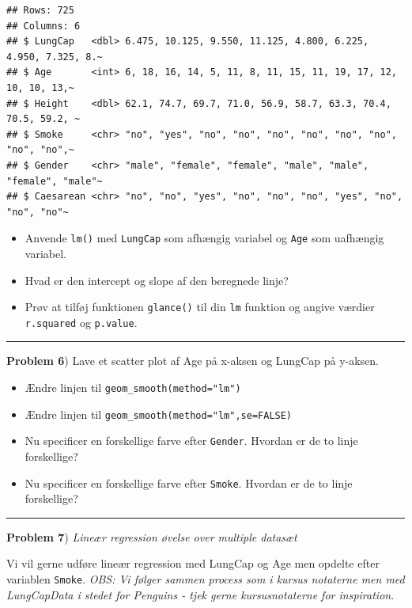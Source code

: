 \documentclass[
]{book}
\providecommand{\tightlist}{%
  \setlength{\itemsep}{0pt}\setlength{\parskip}{0pt}}
\begin{document}
\begin{verbatim}
## Rows: 725
## Columns: 6
## $ LungCap   <dbl> 6.475, 10.125, 9.550, 11.125, 4.800, 6.225, 4.950, 7.325, 8.~
## $ Age       <int> 6, 18, 16, 14, 5, 11, 8, 11, 15, 11, 19, 17, 12, 10, 10, 13,~
## $ Height    <dbl> 62.1, 74.7, 69.7, 71.0, 56.9, 58.7, 63.3, 70.4, 70.5, 59.2, ~
## $ Smoke     <chr> "no", "yes", "no", "no", "no", "no", "no", "no", "no", "no",~
## $ Gender    <chr> "male", "female", "female", "male", "male", "female", "male"~
## $ Caesarean <chr> "no", "no", "yes", "no", "no", "no", "yes", "no", "no", "no"~
\end{verbatim}

\begin{itemize}
\item
  Anvende \texttt{lm()} med \texttt{LungCap} som afhængig variabel og \texttt{Age} som uafhængig variabel.
\item
  Hvad er den intercept og slope af den beregnede linje?
\item
  Prøv at tilføj funktionen \texttt{glance()} til din \texttt{lm} funktion og angive værdier \texttt{r.squared} og \texttt{p.value}.
\end{itemize}

\begin{center}\rule{0.5\linewidth}{0.5pt}\end{center}

\textbf{Problem 6}) Lave et scatter plot af Age på x-aksen og LungCap på y-aksen.

\begin{itemize}
\tightlist
\item
  Ændre linjen til \texttt{geom\_smooth(method="lm")}
\item
  Ændre linjen til \texttt{geom\_smooth(method="lm",se=FALSE)}
\item
  Nu specificer en forskellige farve efter \texttt{Gender}. Hvordan er de to linje forskellige?
\item
  Nu specificer en forskellige farve efter \texttt{Smoke}. Hvordan er de to linje forskellige?
\end{itemize}

\begin{center}\rule{0.5\linewidth}{0.5pt}\end{center}

\textbf{Problem 7}) \emph{Lineær regression øvelse over multiple datasæt}

Vi vil gerne udføre lineær regression med LungCap og Age men opdelte efter variablen \texttt{Smoke}. \emph{OBS: Vi følger sammen process som i kursus notaterne men med LungCapData i stedet for Penguins - tjek gerne kursusnotaterne for inspiration}.
\end{document}
